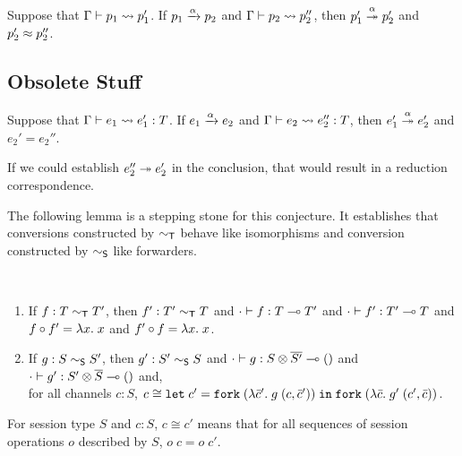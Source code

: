 \begin{conjecture}
  Suppose that $\Ptranslation {p_1}{p_1'}$.
  If $\reduce[\alpha]{p_1}{p_2}$
  and $\Ptranslation{p_2}{p_2''}$,
  then $\reducemany[\alpha]{p_1'}{p_2'}$
  and $p_2' \bisim p_2''$.
\end{conjecture}


\subsection{Obsolete Stuff}
\label{sec:obsolete-stuff}



\begin{conjecture}[obsolete]
  Suppose that $\translation {e_1}{e_1'} T$.
  If $\reduce[\alpha]{e_1}{e_2}$
  and $\translation{e_2}{e_2''}{T}$,
  then $\reducemany[\alpha]{e_1'}{e_2'}$
  and $e_2' = e_2''$.
\end{conjecture}
If we could establish $\reducemany{e_2''}{e_2'}$ in  the
conclusion, that would result in a reduction correspondence.

The following lemma is a stepping stone for this conjecture. It
establishes that conversions constructed by $\eqt$ behave like
isomorphisms and conversion constructed by $\eqs$ like forwarders.
\begin{conjecture}~\\[-\baselineskip]
  \label{lemma:conversion}
  \begin{enumerate}
  \item If $f : T \eqt T'$,
    then $f' : T' \eqt T$
    and $\typing[\CNil]{f}{\TFun T{T'}}$
    and  $\typing[\CNil]{f'}{\TFun {T'}T}$
    and  $f \circ f' = \ELam x x$
    and  $f' \circ f = \ELam x x$.
  \item If $g : S \eqs S'$,
    then $g' : S' \eqs S$
    and $\typing[\CNil]{g}{\TFun {\TPair {S} {\TDual{S'}}} \TUnit}$
    and $\typing[\CNil]{g'}{\TFun {\TPair {S'} {\TDual{S}}} \TUnit}$
    and,\\
    for all channels $c : S$,  $c \cong \ELet{c'}{\EFork{( \ELam {\bar c'} g \; (c, \bar c')) }}{\EFork{( \ELam {\bar c} g' \; (c', \bar c)) }} $.
  \end{enumerate}
\end{conjecture}
For session type $S$ and $c:S$, $c \cong c'$ means that for all
sequences of session operations $o$ described by $S$, $o\; c = o\; c'$.


